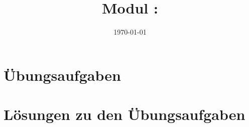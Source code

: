\documentclass[twoside, a4paper]{article}
\title{Modul \GetItDigitalModulnumber: \GetItDigitalModulname}
\author{}
\institute{GET it digital}
\date{\today}
\begin{document}

{\setlength{\parskip}{0.05ex}    %
	\tableofcontents
	\newpage
}

\printnomenclature
\cleardoublepage

\pagestyle{fancyplain}
\setheadkapitel

\cleardoublepage




\cleardoublepage
\appendix
\setheadanhang

\section{Übungsaufgaben}
\renewcommand{\Aufgabe}[1]{#1}
\renewcommand{\Loesung}[1]{}


\section{Lösungen zu den Übungsaufgaben}
\renewcommand{\Aufgabe}[1]{}
\renewcommand{\Loesung}[1]{#1}


\clearpage
{}
\printbibliography

\clearpage
{}
\printindex
\end{document}
